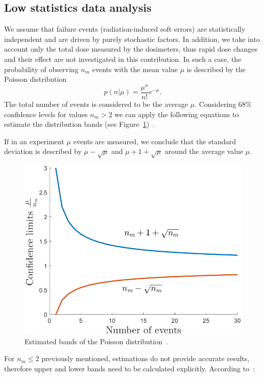 \subsection{Low statistics data analysis}

We assume that failure events (radiation-induced soft errors) are statistically independent and are driven by purely stochastic factors. In addition, we take into account only the total dose measured by the dosimeters, thus rapid dose changes and their effect are not investigated in this contribution. In such a case, the probability of observing $n_{m}$ events with the mean value $\mu$ is described by the Poisson distribution\newline
\begin{equation}
    p(n|\mu) = \frac{\mu^{n}}{n!}e^{-\mu}.
\end{equation}
The total number of events is considered to be the average $\mu$. Considering 68\% confidence levels for values $n_{m} > 2$ we can apply the following equations to estimate the distribution bands (see Figure~\ref{fig:poisson})~\cite{schmidt}.

If in an experiment $\mu$ events are measured, we conclude that the standard deviation is described by $\mu - \sqrt{\mu}$ and $\mu + 1 + \sqrt{\mu}$ around the average value $\mu$.

\begin{figure}[!h]
    \centering
    \includegraphics[width=0.55\columnwidth]{Chapter4/images/poisson.png}
    \caption{Estimated bands of the Poisson distribution~\cite{schmidt}.}
    \label{fig:poisson}
\end{figure}

For $n_{m} \leq 2$ previously mentioned, estimations do not provide accurate results, therefore upper and lower bands need to be calculated explicitly. According to~\cite{schmidt}:



